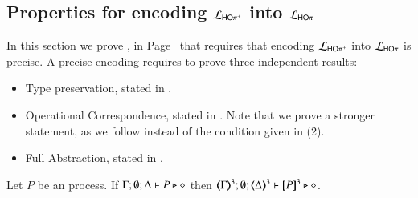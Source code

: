

\subsection{Properties for encoding $\mathcal{L}_{\mathsf{HO\pi^{+}}}$ into $\mathcal{L}_{\mathsf{HO}\pi}$}
\label{app:HOpp_to_HOp}



In this section we prove , in Page~\pageref{f:enc:hoppptohop}
that requires that encoding
$\mathcal{L}_{\mathsf{HO\pi^{+}}}$ into $\mathcal{L}_{\mathsf{HO}\pi}$ is precise.
A precise encoding requires to prove three independent results:
\begin{itemize}
	\item	Type preservation, stated in .
	\item	Operational Correspondence, stated in .
		Note that we prove a stronger statement,
		as we follow 
		instead of the condition given in (2).
	\item	Full Abstraction, stated in .
\end{itemize}

\begin{proposition}\myrm
	\label{app:prop:typepres_HOpp_to_HOp}
	Let $P$ be an \HOpp process.
	If $\Gamma; \emptyset; \Delta \vdash P \triangleright \diamond$ then 
	$\tmap{\Gamma}{3}; \emptyset; \tmap{\Delta}{3} \proves \pmap{P}{3} \hastype \Proc$. 
\end{proposition}

